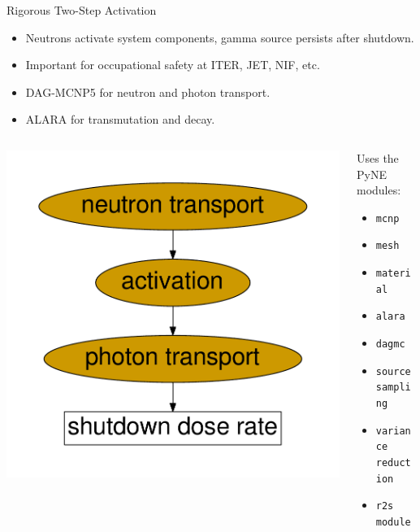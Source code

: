 \documentclass[xcolor=x11names,compress]{beamer}
\begin{document}
\begin{frame}{Rigorous Two-Step Activation}
    \begin{itemize}
        \item Neutrons activate system components, gamma source persists after shutdown.
        \item Important for occupational safety at ITER, JET, NIF, etc.
        \item DAG-MCNP5 \cite{wilson_acceleration_2009} for neutron and photon transport.
        \item ALARA \cite{wilson_alara_1999} for transmutation and decay.
    \end{itemize}

    \begin{columns}
        \begin{column}{0.5\textwidth}
            \centerline{\includegraphics[height=0.5\textheight]{r2s.pdf}}
        \end{column}
        \begin{column}{0.5\textwidth}
            Uses the PyNE modules:
            \begin{itemize}
                \item{\texttt{mcnp}}
                \item{\texttt{mesh}}
                \item{\texttt{material} }
                \item{\texttt{alara}}
                \item{\texttt{dagmc}}
                \item{\texttt{source sampling}}
                \item{\texttt{variance reduction}}
                \item{\texttt{r2s module}}
           \end{itemize}
        \end{column}
    \end{columns}
\end{frame}
\end{document}
